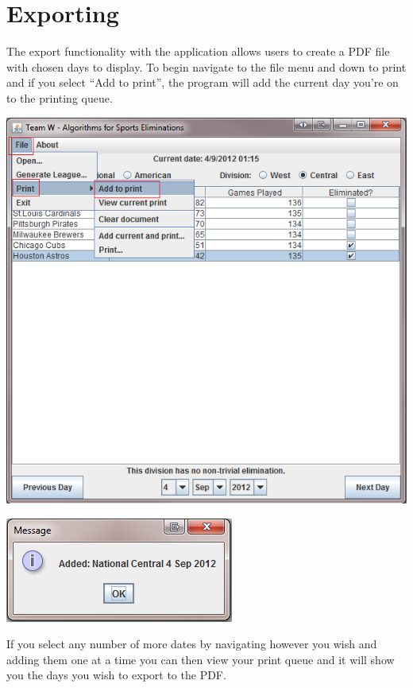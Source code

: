 \newpage

\section{Exporting}

The export functionality with the application allows users to create a PDF file
with chosen days to display. To begin navigate to the file menu and down to
print and if you select ``Add to print'', the program will add the current day
you're on to the printing queue.

\includegraphics[width=\linewidth,height=\measurepage,keepaspectratio]
{images/userManualDesk9.png}

\includegraphics{images/userManualDesk10.png}

\newpage

If you select any number of more dates by navigating however you wish and adding
them one at a time you can then view your print queue and it will show you the
days you wish to export to the PDF.

